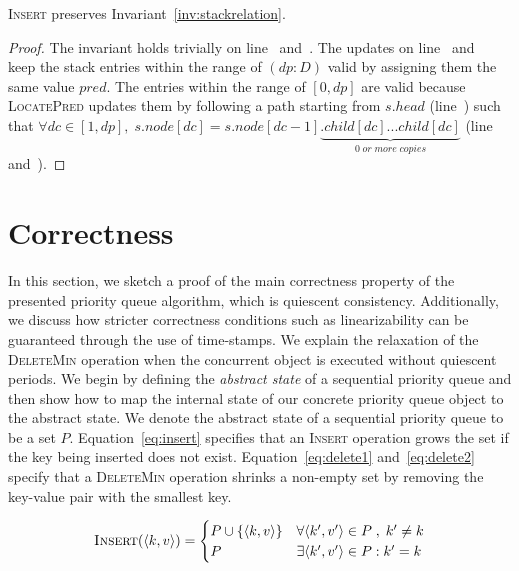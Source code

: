 \documentclass[10pt,journal,letter,compsoc]{IEEEtran}
\begin{document}
\noindent \textsc{Insert} preserves Invariant~\ref{inv:stackrelation}.
\begin{proof}
    The invariant holds trivially on line~ and~.
    The updates on line~ and~ keep the stack entries within the range of $(dp:D)$ valid by assigning them the same value $pred$. 
    The entries within the range of $[0,dp]$ are valid because \textsc{LocatePred} updates them by following a path starting from $s.head$ (line~) such that $\forall dc\in[1,dp],\;s.node[dc]=s.node[dc-1]\underbrace{.child[dc]...child[dc]}_{0\;or\;more\;copies}$ (line~ and~).
\end{proof}

\section{Correctness}
\label{sec:correctness}
In this section, we sketch a proof of the main correctness property of the presented priority queue algorithm, which is quiescent consistency. 
Additionally, we discuss how stricter correctness conditions such as linearizability can be guaranteed through the use of time-stamps.
We explain the relaxation of the \textsc{DeleteMin} operation when the concurrent object is executed without quiescent periods. 
We begin by defining the \emph{abstract state} of a sequential priority queue and then show how to map the internal state of our concrete priority queue object to the abstract state.
We denote the abstract state of a sequential priority queue to be a set $P$.
Equation~\ref{eq:insert} specifies that an \textsc{Insert} operation grows the set if the key being inserted does not exist.
Equation~\ref{eq:delete1} and~\ref{eq:delete2} specify that a \textsc{DeleteMin} operation shrinks a non-empty set by removing the key-value pair with the smallest key.

\begin{equation} \label{eq:insert}
    \textsc{Insert}(\langle k,v \rangle)= \begin{cases}
        P \cup \{\langle k,v\rangle\} & \forall \langle k',v'\rangle \in P\;,\;k' \neq k\\
        P & \exists \langle k',v' \rangle \in P : k'=k
    \end{cases}
\end{equation}
\end{document}
